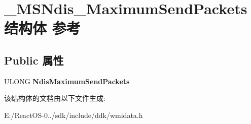 \hypertarget{struct___m_s_ndis___maximum_send_packets}{}\section{\+\_\+\+M\+S\+Ndis\+\_\+\+Maximum\+Send\+Packets结构体 参考}
\label{struct___m_s_ndis___maximum_send_packets}
\subsection*{Public 属性}
\begin{DoxyCompactItemize}
\item 
\mbox{\label{struct___m_s_ndis___maximum_send_packets_acbbeb9109d79af983e81a36952f064e3}} 
U\+L\+O\+NG {\bfseries Ndis\+Maximum\+Send\+Packets}
\end{DoxyCompactItemize}


该结构体的文档由以下文件生成\+:\begin{DoxyCompactItemize}
\item 
E\+:/\+React\+O\+S-\/0../sdk/include/ddk/wmidata.\+h\end{DoxyCompactItemize}
